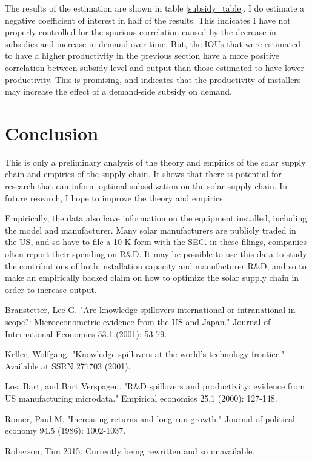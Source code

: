 \documentclass{article}
\begin{document}
The results of the estimation are shown in table \ref{subsidy_table}. I do estimate a negative coefficient of interest in half of the results. This indicates I have not properly controlled for the spurious correlation caused by the decrease in subsidies and increase in demand over time. But, the IOUs that were estimated to have a higher productivity in the previous section have a more positive correlation between subsidy level and output than those estimated to have lower productivity. This is promising, and indicates that the productivity of installers may increase the effect of a demand-side subsidy on demand.


\section{Conclusion}

This is only a preliminary analysis of the theory and empirics of the solar supply chain and empirics of the supply chain. It shows that there is potential for research that can inform optimal subsidization on the solar supply chain. In future research, I hope to improve the theory and empirics. 

Empirically, the data also have information on the equipment installed, including the model and manufacturer. Many solar manufacturers are publicly traded in the US, and so have to file a 10-K form with the SEC. in these filings, companies often report their spending on R\&D. It may be possible to use this data to study the contributions of both installation capacity and manufacturer R\&D, and so to make an empirically backed claim on how to optimize the solar supply chain in order to increase output.


\begin{thebibliography}{1}

\bibitem{} Branstetter, Lee G. "Are knowledge spillovers international or intranational in scope?: Microeconometric evidence from the US and Japan." Journal of International Economics 53.1 (2001): 53-79.

\bibitem{} Keller, Wolfgang. "Knowledge spillovers at the world's technology frontier." Available at SSRN 271703 (2001).

\bibitem{} Los, Bart, and Bart Verspagen. "R\&D spillovers and productivity: evidence from US manufacturing microdata." Empirical economics 25.1 (2000): 127-148.

\bibitem{} Romer, Paul M. "Increasing returns and long-run growth." Journal of political economy 94.5 (1986): 1002-1037.

\bibitem{} Roberson, Tim 2015. Currently being rewritten and so unavailable.

\end{thebibliography}
\end{document}
